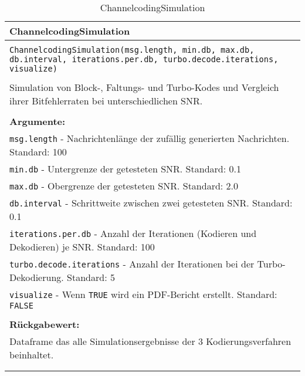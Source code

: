 \begin{longtable}{|p{\textwidth}|}
\hline
\rowcolor{lightblue}
ChannelcodingSimulation
\\
\hline
\\
\texttt{ChannelcodingSimulation(msg.length, min.db, max.db, db.interval, iterations.per.db, turbo.decode.iterations, visualize)}\\
\\
Simulation von Block-, Faltungs- und Turbo-Kodes und Vergleich ihrer Bitfehlerraten bei unterschiedlichen SNR.\\
\\
\textbf{Argumente:}\\
\texttt{msg.length} - Nachrichtenlänge der zufällig generierten Nachrichten. Standard: 100\\
\texttt{min.db} - Untergrenze der getesteten SNR. Standard: 0.1\\
\texttt{max.db} - Obergrenze der getesteten SNR. Standard: 2.0\\
\texttt{db.interval} - Schrittweite zwischen zwei getesteten SNR. Standard: 0.1\\
\texttt{iterations.per.db} - Anzahl der Iterationen (Kodieren und Dekodieren) je SNR. Standard: 100\\
\texttt{turbo.decode.iterations} - Anzahl der Iterationen bei der Turbo-Dekodierung. Standard: 5\\
\texttt{visualize} - Wenn \texttt{TRUE} wird ein PDF-Bericht erstellt. Standard: \texttt{FALSE}\\
\\
\textbf{Rückgabewert:}\\
Dataframe das alle Simulationsergebnisse der 3 Kodierungsverfahren beinhaltet.\\
\\
\hline
\caption{ChannelcodingSimulation}
\label{funktion:ChannelcodingSimulation}
\end{longtable}
